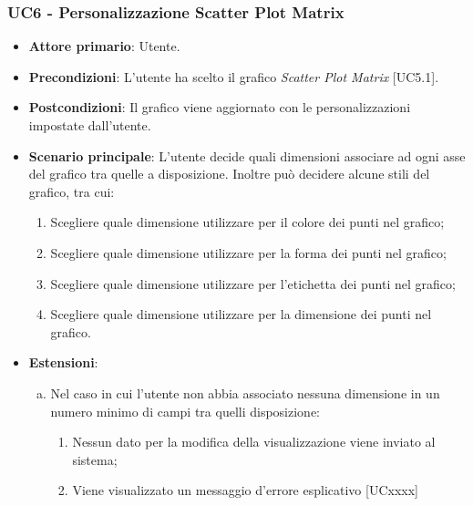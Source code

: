 \subsubsection{UC6 - Personalizzazione Scatter Plot Matrix}
\begin{itemize}
	\item \textbf{Attore primario}: Utente.
	
	\item \textbf{Precondizioni}: L'utente ha scelto il grafico \textit{Scatter Plot Matrix} [UC5.1].
	
	\item \textbf{Postcondizioni}: Il grafico viene aggiornato con le personalizzazioni impostate dall'utente.
	
	\item \textbf{Scenario principale}: L'utente decide quali dimensioni associare ad ogni asse del grafico tra quelle a disposizione. Inoltre può decidere alcune stili del grafico, tra cui:
		\begin{enumerate}
			\item Scegliere quale dimensione utilizzare per il colore dei punti nel grafico;
				
			\item Scegliere quale dimensione utilizzare per la forma dei punti nel grafico;
			
			\item Scegliere quale dimensione utilizzare per l'etichetta dei punti nel grafico;
			
			\item Scegliere quale dimensione utilizzare per la dimensione dei punti nel grafico.
				
		\end{enumerate}
		
	\item \textbf{Estensioni}:
	\begin{enumerate}[(a)]
		\item Nel caso in cui l'utente non abbia associato nessuna dimensione in un numero minimo di campi tra quelli disposizione:
		\begin{enumerate}
			\item Nessun dato per la modifica della visualizzazione viene inviato al sistema;
			\item Viene visualizzato un messaggio d'errore esplicativo [UCxxxx]
		\end{enumerate}
	\end{enumerate}
\end{itemize}


